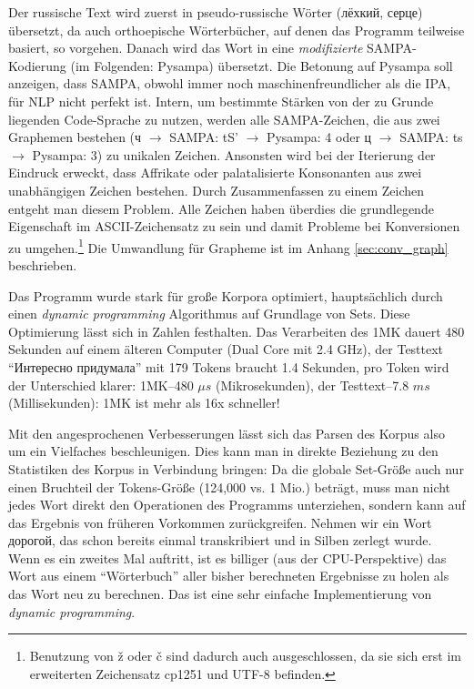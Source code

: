 \documentclass[12pt,headsepline,a4paper]{scrartcl}
\newcommand\textcyr[1]{{\fontencoding{OT2}\fontfamily{wncyr}\selectfont #1}}
\begin{document}
Der russische Text wird zuerst in pseudo-russische Wörter (\textcyr{лёхкий, серце}) übersetzt, da auch orthoepische Wörterbücher, auf denen das Programm teilweise basiert, so vorgehen. Danach wird das Wort in eine \textit{modifizierte} SAMPA-Kodierung (im Folgenden: Pysampa) übersetzt. Die Betonung auf Pysampa soll anzeigen, dass SAMPA, obwohl immer noch maschinenfreundlicher als die IPA, für NLP nicht perfekt ist. Intern, um bestimmte Stärken von der zu Grunde liegenden Code-Sprache zu nutzen, werden alle SAMPA-Zeichen, die aus zwei Graphemen bestehen (\textcyr{ч} $\to$ SAMPA: tS' $\to$ Pysampa: 4 oder \textcyr{ц} $\to$ SAMPA: ts $\to$ Pysampa: 3) zu unikalen Zeichen. Ansonsten wird bei der Iterierung der Eindruck erweckt, dass Affrikate oder palatalisierte Konsonanten aus zwei unabhängigen Zeichen bestehen. Durch Zusammenfassen zu einem Zeichen entgeht man diesem Problem. Alle Zeichen haben überdies die grundlegende Eigenschaft im ASCII-Zeichensatz zu sein und damit Probleme bei Konversionen zu umgehen.\footnote{Benutzung von ž oder č sind dadurch auch ausgeschlossen, da sie sich erst im erweiterten Zeichensatz cp1251 und UTF-8 befinden.} Die Umwandlung für Grapheme ist im Anhang \ref{sec:conv_graph} beschrieben.

Das Programm wurde stark für große Korpora optimiert, hauptsächlich durch einen \textit{dynamic programming} Algorithmus auf Grundlage von Sets.
Diese Optimierung lässt sich in Zahlen festhalten. Das Verarbeiten des 1MK dauert 480 Sekunden auf einem älteren Computer (Dual Core mit 2.4 GHz), der Testtext "`\textcyr{Интересно придумала}"' mit 179 Tokens braucht 1.4 Sekunden, pro Token wird der Unterschied klarer: 1MK--480 $\mu s$ (Mikrosekunden), der Testtext--7.8 $ms$ (Millisekunden): 1MK ist mehr als 16x schneller!

Mit den angesprochenen Verbesserungen lässt sich das Parsen des Korpus also um ein Vielfaches beschleunigen. Dies kann man in direkte Beziehung zu den Statistiken des Korpus in Verbindung bringen: Da die globale Set-Größe auch nur einen Bruchteil
der Tokens-Größe (124,000 vs. 1 Mio.) beträgt, muss man nicht jedes Wort direkt den Operationen des Programms unterziehen, sondern kann auf das Ergebnis von früheren Vorkommen zurückgreifen. Nehmen wir ein Wort \textcyr{дорогой}, das schon bereits einmal transkribiert und in Silben zerlegt wurde. Wenn es ein zweites Mal auftritt, ist es billiger (aus der CPU-Perspektive) das Wort aus einem "`Wörterbuch"' aller bisher berechneten Ergebnisse zu holen als das Wort neu zu berechnen. Das ist eine sehr einfache Implementierung von \textit{dynamic programming}.
\end{document}
